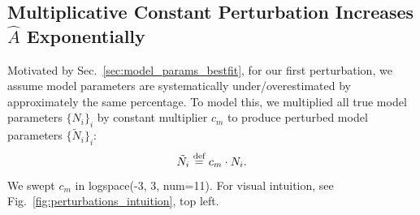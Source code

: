 \subsection{Multiplicative Constant Perturbation Increases $\hat{A}$ Exponentially}
\label{sec:robustness_analysis:subsec:multiplicative_constant}

Motivated by Sec.~\ref{sec:model_params_bestfit}, for our first perturbation, we assume model parameters are systematically under/overestimated by approximately the same percentage.
To model this, we multiplied all true model parameters $\{N_i\}_i$ by constant multiplier $c_m$ to produce perturbed model parameters $\{\tilde{N}_i\}_i$:
%
\begin{equation}\label{eqn:multiplicative_constant}
    \Tilde{N}_i \operatorname{\stackrel{\text{def}}{\;=\;}} c_m \cdot  N_i .
\end{equation}
%
We swept $c_m$ in logspace(-3, 3, num=11). For visual intuition, see Fig.~\ref{fig:perturbations_intuition}, top left. 

